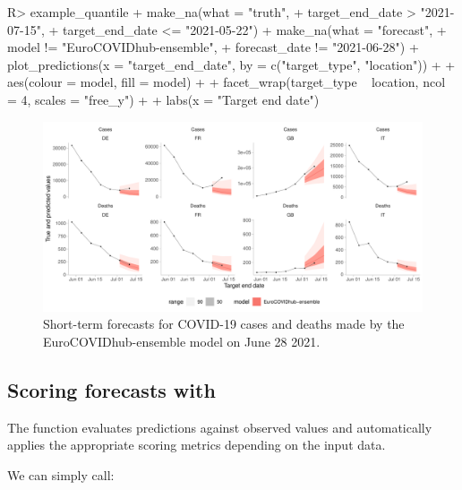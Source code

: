 \documentclass[
]{jss}
\begin{document}
\begin{CodeChunk}
\begin{CodeInput}
R> example_quantile %
+   make_na(what = "truth",
+           target_end_date > "2021-07-15",
+           target_end_date <= "2021-05-22") %
+   make_na(what = "forecast",
+           model != "EuroCOVIDhub-ensemble",
+           forecast_date != "2021-06-28") %
+   plot_predictions(x = "target_end_date", by = c("target_type", "location")) +
+   aes(colour = model, fill = model) +
+   facet_wrap(target_type ~ location, ncol = 4, scales = "free_y") +
+   labs(x = "Target end date")
\end{CodeInput}
\begin{figure}[!h]

{\centering \includegraphics[width=1\linewidth]{manuscript_files/figure-latex/forecast-visualisation-1}

}

\caption[Short-term forecasts for COVID-19 cases and deaths made by the EuroCOVIDhub-ensemble model on June 28 2021]{Short-term forecasts for COVID-19 cases and deaths made by the EuroCOVIDhub-ensemble model on June 28 2021.}\label{fig:forecast-visualisation}
\end{figure}
\end{CodeChunk}

\subsection[Scoring forecasts with score()]{Scoring forecasts with
}\label{scoring}

The function  evaluates predictions against observed
values and automatically applies the appropriate scoring metrics
depending on the input data.

We can simply call:
\end{document}
